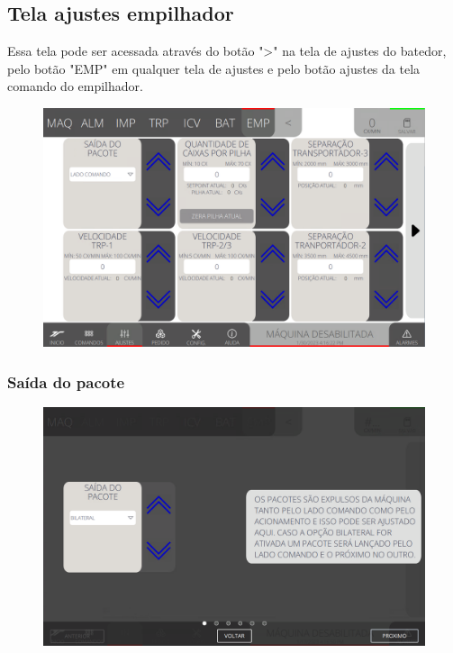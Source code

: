 \thispagestyle{fancy}
\vspace*{40 pt}
\subsection{Tela ajustes empilhador} \label{sec:telaAjustesEmpilhador}
Essa tela pode ser acessada através do botão "\textgreater" na tela de ajustes do batedor, pelo botão "EMP" em qualquer tela de ajustes e pelo botão ajustes da tela comando do empilhador.
\vspace*{\fill}
\begin{figure}[h]
    \centering
    \includegraphics[width=480 px,height=300 px]{src/imagesICV/08-stacker/settings/Tela-Principal.png}
\end{figure}
\vspace*{\fill}

\newpage
\thispagestyle{fancy}
\vspace*{40 pt}
\subsubsection{\small{Saída do pacote}} \label{sec:telaAjustesEmpilhadorSaidaPacote}
\vspace*{\fill}
\begin{figure}[h]
    \centering
    \includegraphics[width=576 px,height=360 px]{src/imagesICV/08-stacker/settings/1.png}
\end{figure}
\vspace*{\fill}

